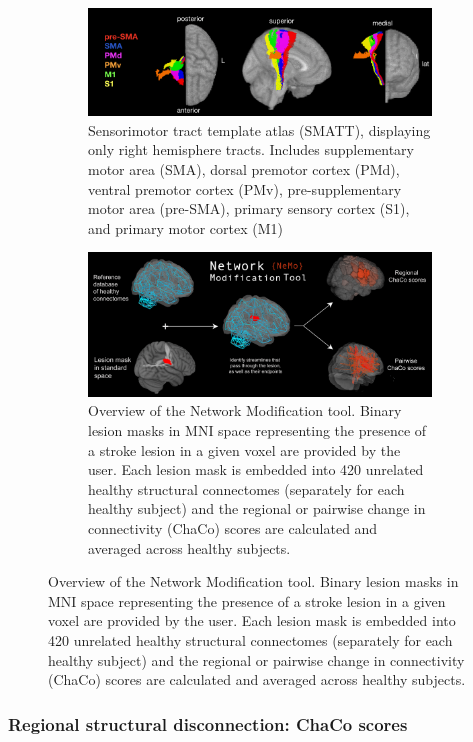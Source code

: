 \documentclass[10pt]{article}
\begin{document}
\begin{figure}
\begin{subfigure}{1\textwidth}
  \centering
  \includegraphics[width=1\linewidth]{figures/smatt_template.png}
  \caption{Sensorimotor tract template atlas (SMATT), displaying only right hemisphere tracts. Includes supplementary motor area (SMA), dorsal premotor cortex (PMd), ventral premotor cortex (PMv), pre-supplementary motor area (pre-SMA), primary sensory cortex (S1),  and primary motor cortex (M1)}
  \label{fig:fig1}
\end{subfigure}
\caption{Lesion biomarkers}
\label{fig:fig}

\begin{subfigure}{1\textwidth}
  \centering
  \includegraphics[width=1\linewidth]{figures/NetworkModificationTool.png}
  \caption{Overview of the Network Modification tool. Binary lesion masks in MNI space representing the presence of a stroke lesion in a given voxel are provided by the user. Each lesion mask is embedded into 420 unrelated healthy structural connectomes (separately for each healthy subject) and the regional or pairwise change in connectivity (ChaCo) scores are calculated and averaged across healthy subjects. }
  \label{fig:fig2}
\end{subfigure}

\end{figure}

\subsubsection*{Regional structural disconnection: ChaCo scores}
\end{document}
